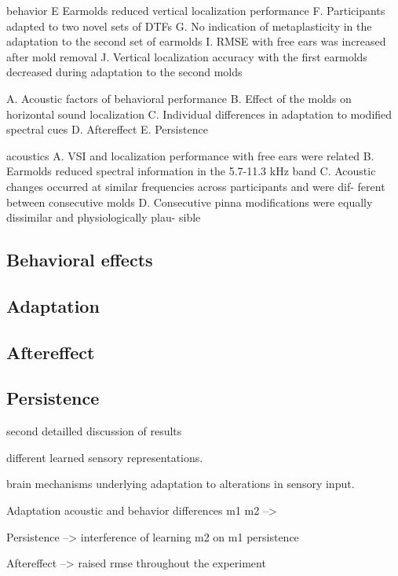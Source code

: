 behavior
E Earmolds reduced vertical localization performance
F. Participants adapted to two novel sets of DTFs
G. No indication of metaplasticity in the adaptation to the second set of earmolds
I. RMSE with free ears was increased after mold removal
J. Vertical localization accuracy with the first earmolds decreased during adaptation to the second molds


A. Acoustic factors of behavioral performance
B. Effect of the molds on horizontal sound localization
C. Individual differences in adaptation to modified spectral cues
D. Aftereffect
E. Persistence

acoustics
A. VSI and localization performance with free ears were related
B. Earmolds reduced spectral information in the 5.7-11.3 kHz band
C. Acoustic changes occurred at similar frequencies across participants and were dif- ferent between consecutive molds
D. Consecutive pinna modifications were equally dissimilar and physiologically plau- sible


\subsection{Behavioral effects}

\subsection{Adaptation}

\subsection{Aftereffect}

\subsection{Persistence}

second detailled discussion of results

different learned sensory representations.

brain mechanisms underlying adaptation to alterations in sensory input. 

Adaptation acoustic and behavior differences m1 m2 --> 

Persistence --> interference of learning m2 on m1 persistence

Aftereffect --> raised rmse throughout the experiment




